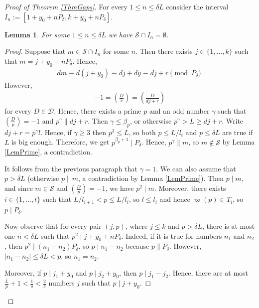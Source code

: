 \documentclass[a4paper]{amsart}
\newtheorem{lem}{Lemma}
\newcommand{\1}{\mathbbm{1}}
\begin{document}
\begin{proof}[Proof of Theorem \ref{ThmGaps}]
For every $1\leq n\leq \delta L$ consider the interval $I_{n}:=[1+y_{0}+nP_{\delta},k+y_{0}+nP_{\delta}]$.

\begin{lem}
For some $1\leq n \leq \delta L$ we have $\mathcal{S}\cap I_{n}=\emptyset$.
\end{lem}
\begin{proof}
Suppose that $m\in\mathcal{S}\cap I_{n}$ for some $n$. Then there exists $j\in\{1,\ldots,k\}$ such that $m=j+y_{0}+nP_{\delta}$. Hence,
\begin{align*}
dm\equiv d(j+y_{0})\equiv dj+dy\equiv dj+r \pmod{P_{\delta}}.
\end{align*}
However,
\begin{align*}
-1=\left(\frac{D}{r}\right)=\left(\frac{D}{dj+r}\right)
\end{align*}
for every $D\in\mathcal{D}$. Hence, there exists a prime $p$ and an odd number $\gamma$ such that $\left(\frac{D}{p}\right)=-1$ and $p^{\gamma}\| dj+r$. Then $\gamma\leq\beta_{p}$, or otherwise $p^{\gamma}>L\geq dj+r$. Write $dj+r=p^{\gamma}l$. Hence, if $\gamma\geq 3$ then $p^{3}\leq L$, so both $p\leq L/l_{t}$ and $p\leq\delta L$ are true if $L$ is big enough. Therefore, we get $p^{\beta_{p}+1}\mid P_{\delta}$. Hence, $p^{\gamma}\| m$, so $m\not\in\mathcal{S}$ by Lemma \ref{LemPrime}, a contradiction.

It follows from the previous paragraph that $\gamma =1$. We can also assume that $p>\delta L$ (otherwise $p\| m$, a contradiction by Lemma \ref{LemPrime}). Then $p\mid m$, and since $m\in\mathcal{S}$ and $\left(\frac{D}{p}\right)=-1$, we have $p^{2}\mid m$. Moreover, there exists $i\in\{1,\ldots, t\}$ such that $L/l_{i+1}<p\leq L/l_{i}$, so $l\leq l_{i}$ and hence $\varpi (p)\in T_{i}$, so $p\mid P_{\delta}$.

Now observe that for every pair $(j,p)$, where $j\leq k$ and $p>\delta L$, there is at most one $n<\delta L$ such that $p^{2}\mid j+y_{0}+nP_{\delta}$. Indeed, if it is true for numbers $n_{1}$ and $n_{2}$, then $p^{2}\mid (n_{1}-n_{2})P_{\delta}$, so $p\mid n_{1}-n_{2}$ because $p\| P_{\delta}$. However, $|n_{1}-n_{2}|\leq \delta L<p$, so $n_{1}=n_{2}$.

Moreover, if $p\mid j_{1}+y_{0}$ and $p\mid j_{2}+y_{0}$, then $p\mid j_{1}-j_{2}$. Hence, there are at most $\frac{L}{p}+1<\frac{1}{\delta}<\frac{2}{\delta}$ numbers $j$ such that $p\mid j+y_{0}$.


\end{proof}
\end{proof}
\end{document}
